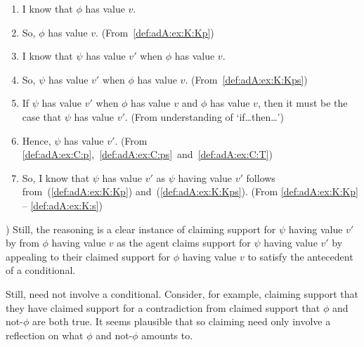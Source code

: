 \begin{note}
{\begin{enumerate}[label=\arabic*., ref=\arabic*]
    \item\label{def:adA:ex:K:Kp} I know that \(\phi\) has value \(v\).
    \item\label{def:adA:ex:K:p} So, \(\phi\) has value \(v\). \hfill (From~\ref{def:adA:ex:K:Kp})
    \item\label{def:adA:ex:K:Kps} I know that \(\psi\) has value \(v'\) when \(\phi\) has value \(v\).
    \item\label{def:adA:ex:K:ps} So, \(\psi\) has value \(v'\) when \(\phi\) has value \(v\). \hfill(From~\ref{def:adA:ex:K:Kps})
    \item\label{def:adA:ex:K:T} If \(\psi\) has value \(v'\) when \(\phi\) has value \(v\) and \(\phi\) has value \(v\), then it must be the case that \(\psi\) has value \(v'\). \hfill (From understanding of `if\dots then\dots')
    \item\label{def:adA:ex:K:s} Hence, \(\psi\) has value \(v'\). \hfill (From \ref{def:adA:ex:C:p},~\ref{def:adA:ex:C:ps}~and~\ref{def:adA:ex:C:T})
    \item So, I know that \(\psi\) has value \(v'\) as \(\psi\) having value \(v'\) follows from~(\ref{def:adA:ex:K:Kp}) and~(\ref{def:adA:ex:K:Kps}).
      \mbox{}\hfill (From \ref{def:adA:ex:K:Kp} -- \ref{def:adA:ex:K:s})
    \end{enumerate}
  }%
  )
  Still, the reasoning is a clear instance of claiming support for \(\psi\) having value \(v'\) by \adA{} from \(\phi\) having value \(v\) as the agent claims support for \(\psi\) having value \(v'\) by appealing to their claimed support for \(\phi\) having value \(v\) to satisfy the antecedent of a conditional.

  Still, \adA{} need not involve a conditional.
  Consider, for example, claiming support that they have claimed support for a contradiction from claimed support that \(\phi\) and not-\(\phi\) are both true.
  It seems plausible that so claiming need only involve a reflection on what \(\phi\) and not-\(\phi\) amounts to.
\end{note}

